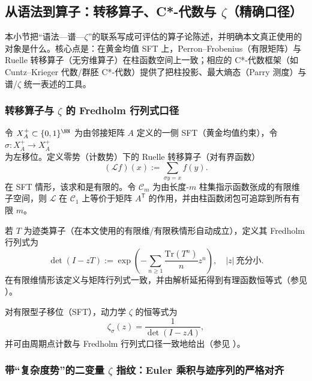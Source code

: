 \subsection{从语法到算子：转移算子、C*-代数与 \texorpdfstring{$\zeta$}{zeta}（精确口径）}\label{subsec:operator-zeta-interface}

本小节把“语法—谱—$\zeta$”的联系写成可评估的算子论陈述，并明确本文真正使用的对象是什么。核心点是：在黄金均值 SFT 上，Perron--Frobenius（有限矩阵）与 Ruelle 转移算子（无穷维算子）在柱函数空间上一致；相应的 C*-代数框架（如 Cuntz--Krieger 代数/群胚 C*-代数）提供了把柱投影、最大熵态（Parry 测度）与谱/$\zeta$ 统一表述的工具。

\subsubsection{转移算子与 \texorpdfstring{$\zeta$}{zeta} 的 Fredholm 行列式口径}

令 $X_A^+\subset\{0,1\}^{\NN}$ 为由邻接矩阵 $A$ 定义的一侧 SFT（黄金均值约束），令 $\sigma:X_A^+\to X_A^+$ 为左移位。定义零势（计数势）下的 Ruelle 转移算子（对有界函数）
\[
(\mathcal{L}f)(x):=\sum_{\sigma y=x} f(y).
\]
在 SFT 情形，该求和是有限的。令 $\mathcal{C}_m$ 为由长度-$m$ 柱集指示函数张成的有限维子空间，则 $\mathcal{L}$ 在 $\mathcal{C}_1$ 上等价于矩阵 $A^{\mathsf T}$ 的作用，并由柱函数闭包可追踪到所有有限 $m$。

\begin{definition}\label{def:fredholm-determinant}
若 $T$ 为迹类算子（在本文使用的有限维/有限秩情形自动成立），定义其 Fredholm 行列式为
\[
\det(I-zT):=\exp\left(-\sum_{n\ge 1}\frac{\mathrm{Tr}(T^n)}{n}z^n\right),
\quad |z|\ \text{充分小}.
\]
在有限维情形该定义与矩阵行列式一致，并由解析延拓得到有理函数恒等式（参见 \cite{Ruelle1976ZetaExpanding,ParryPollicott1990Zeta}）。
\end{definition}

对有限型子移位（SFT），动力学 $\zeta$ 的恒等式为
\[
\zeta_\sigma(z)=\frac{1}{\det(I-zA)},
\]
并可由周期点计数与 Fredholm 行列式口径一致地给出（参见 \cite{LindMarcus1995,Ruelle1976ZetaExpanding,Ruelle1978Thermodynamic,ParryPollicott1990Zeta}）。

\subsubsection{带“复杂度势”的二变量 \texorpdfstring{$\zeta$}{zeta} 指纹：Euler 乘积与迹序列的严格对齐}\label{subsec:zeta-two-variable-kappa}

